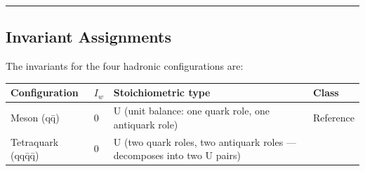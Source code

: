 \begin{center}\rule{0.5\linewidth}{0.5pt}\end{center}

\hypertarget{invariant-assignments}{%
\subsection{Invariant Assignments}\label{invariant-assignments}}

The invariants for the four hadronic configurations are:

\begin{longtable}[]{@{}llll@{}}
\toprule
\begin{minipage}[b]{0.22\columnwidth}\raggedright
Configuration\strut
\end{minipage} & \begin{minipage}[b]{0.22\columnwidth}\raggedright
\(I_w\)\strut
\end{minipage} & \begin{minipage}[b]{0.22\columnwidth}\raggedright
Stoichiometric type\strut
\end{minipage} & \begin{minipage}[b]{0.22\columnwidth}\raggedright
Class\strut
\end{minipage}\tabularnewline
\midrule
\endhead
\begin{minipage}[t]{0.22\columnwidth}\raggedright
Meson (qq̄)\strut
\end{minipage} & \begin{minipage}[t]{0.22\columnwidth}\raggedright
0\strut
\end{minipage} & \begin{minipage}[t]{0.22\columnwidth}\raggedright
U (unit balance: one quark role, one antiquark role)\strut
\end{minipage} & \begin{minipage}[t]{0.22\columnwidth}\raggedright
Reference\strut
\end{minipage}\tabularnewline
\begin{minipage}[t]{0.22\columnwidth}\raggedright
Tetraquark (qqq̄q̄)\strut
\end{minipage} & \begin{minipage}[t]{0.22\columnwidth}\raggedright
0\strut
\end{minipage} & \begin{minipage}[t]{0.22\columnwidth}\raggedright
U (two quark roles, two antiquark roles --- decomposes into two U
pairs)\strut
\end{minipage} & \begin{minipage}[t]{0.22\columnwidth}\raggedright

\end{minipage}
\end{longtable}

